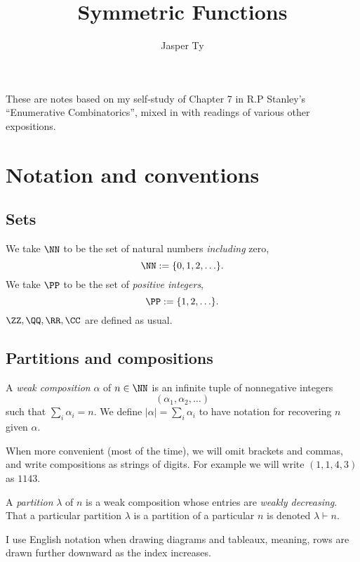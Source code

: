 \documentclass{article}
\title{Symmetric Functions}
\author{Jasper Ty}
\date{}
\begin{document}
\maketitle

These are notes based on my self-study of Chapter 7 in R.P Stanley's ``Enumerative Combinatorics'', mixed in with readings of various other expositions. 


\tableofcontents

\section*{Notation and conventions}

\subsection*{Sets}

We take $\NN$ to be the set of natural numbers \textit{including} zero,
\[
    \NN := \{0,1,2,\ldots\}.
\]
We take $\PP$ to be the set of \textit{positive integers},
\[
    \PP := \{1,2,\ldots\}.
\]
$\ZZ,\QQ,\RR,\CC$ are defined as usual.

\subsection*{Partitions and compositions}

A \textit{weak composition} $\alpha$ of $n \in \NN$ is an infinite tuple of nonnegative integers 
\[
    (\alpha_1, \alpha_2, \ldots)
\]
such that $\sum_i \alpha_i = n$. 
We define $|\alpha| = \sum_i \alpha_i$ to have notation for recovering $n$ given $\alpha$.

When more convenient (most of the time), we will omit brackets and commas, and write compositions as strings of digits. For example we will write $(1,1,4,3)$ as $1143$.

A \textit{partition} $\lambda$ of $n$ is a weak composition whose entries are \textit{weakly decreasing}. 
That a particular partition $\lambda$ is a partition of a particular $n$ is denoted $\lambda \vdash n$. 

I use English notation when drawing diagrams and tableaux, meaning, rows are drawn further downward as the index increases.
\end{document}
